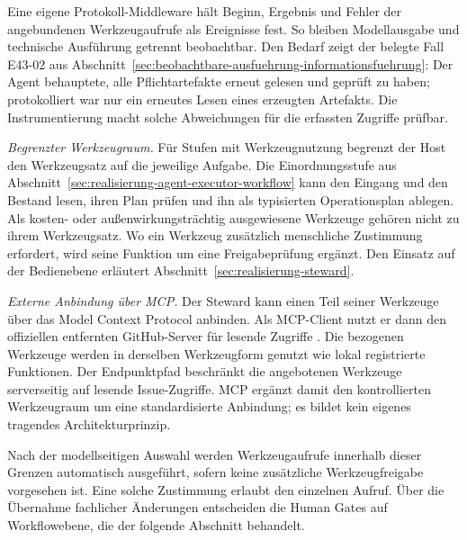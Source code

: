 Eine eigene Protokoll-Middleware hält Beginn, Ergebnis und Fehler
der angebundenen Werkzeugaufrufe als Ereignisse fest. So bleiben
Modellausgabe und technische Ausführung getrennt beobachtbar.
Den Bedarf zeigt der belegte Fall E43-02 aus
Abschnitt~\ref{sec:beobachtbare-ausfuehrung-informationsfuehrung}:
Der Agent behauptete, alle Pflichtartefakte erneut gelesen und
geprüft zu haben; protokolliert war nur ein erneutes Lesen eines
erzeugten Artefakts. Die Instrumentierung macht solche Abweichungen
für die erfassten Zugriffe prüfbar.

\emph{Begrenzter Werkzeugraum.} Für Stufen mit Werkzeugnutzung
begrenzt der Host den Werkzeugsatz auf die jeweilige Aufgabe. Die
Einordnungsstufe aus
Abschnitt~\ref{sec:realisierung-agent-executor-workflow} kann den
Eingang und den Bestand lesen, ihren Plan prüfen und ihn als
typisierten Operationsplan ablegen. Als kosten- oder
außenwirkungsträchtig ausgewiesene Werkzeuge gehören nicht zu
ihrem Werkzeugsatz. Wo ein Werkzeug zusätzlich menschliche
Zustimmung erfordert, wird seine Funktion um eine Freigabeprüfung
ergänzt. Den Einsatz auf der Bedienebene erläutert
Abschnitt~\ref{sec:realisierung-steward}.

\emph{Externe Anbindung über MCP.} Der Steward kann einen Teil
seiner Werkzeuge über das Model Context Protocol anbinden. Als
MCP-Client nutzt er dann den offiziellen entfernten GitHub-Server für
lesende Zugriffe \cite{github2026remotemcp}.
Die bezogenen Werkzeuge werden in derselben Werkzeugform genutzt
wie lokal registrierte Funktionen. Der Endpunktpfad beschränkt die angebotenen Werkzeuge
serverseitig auf lesende Issue-Zugriffe. MCP ergänzt damit den
kontrollierten Werkzeugraum um eine standardisierte Anbindung;
es bildet kein eigenes tragendes Architekturprinzip.

Nach der modellseitigen Auswahl werden Werkzeugaufrufe innerhalb
dieser Grenzen automatisch ausgeführt, sofern keine zusätzliche
Werkzeugfreigabe vorgesehen ist. Eine solche Zustimmung erlaubt
den einzelnen Aufruf. Über die Übernahme fachlicher Änderungen
entscheiden die Human Gates auf Workflowebene, die der folgende
Abschnitt behandelt.

